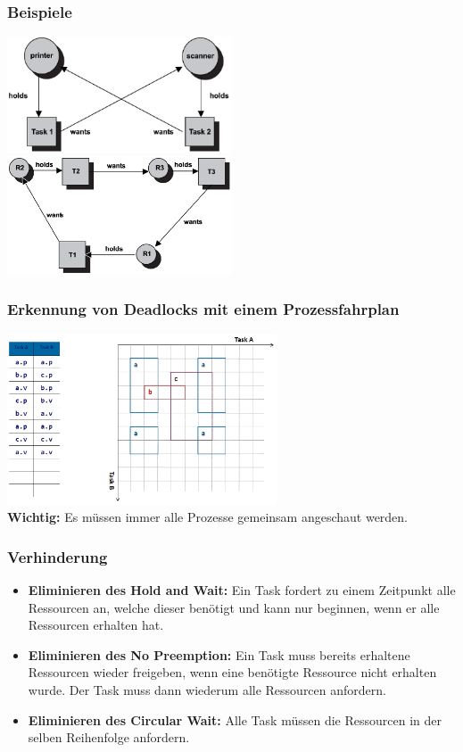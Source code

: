 \subsubsection{Beispiele}
\begin{multicols}{2}
    \includegraphics[width=0.5\textwidth]{images/Betriebssysteme/deadlock_2.png}
    \includegraphics[width=0.5\textwidth]{images/Betriebssysteme/deadlock_3.png}
\end{multicols}

\subsubsection{Erkennung von Deadlocks mit einem Prozessfahrplan}
\includegraphics[width=0.6\textwidth]{images/Betriebssysteme/fahrplan.png} \\
\textbf{Wichtig:} Es müssen immer alle Prozesse gemeinsam angeschaut werden. 


\subsubsection{Verhinderung}
\begin{itemize}
    \item \textbf{Eliminieren des Hold and Wait:} Ein Task fordert zu einem Zeitpunkt alle Ressourcen an, welche dieser benötigt und kann nur beginnen, wenn er alle Ressourcen erhalten hat.
    \item \textbf{Eliminieren des No Preemption:} Ein Task muss bereits erhaltene Ressourcen wieder freigeben, wenn eine benötigte Ressource nicht erhalten wurde. Der Task muss dann wiederum alle Ressourcen anfordern.
    \item \textbf{Eliminieren des Circular Wait:} Alle Task müssen die Ressourcen in der selben Reihenfolge anfordern.
\end{itemize}


